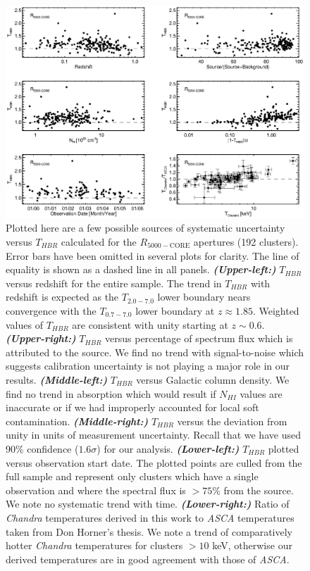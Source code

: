 \clearpage
\begin{figure}
\begin{center}
\includegraphics*[width=\textwidth, trim=0mm 0mm 0mm 0mm, clip]{f5.eps}
\caption{
Plotted here are a few possible sources of systematic uncertainty
versus $T_{HBR}$ calculated for the $R_{5000-\mathrm{CORE}}$
apertures (192 clusters). Error bars have been omitted in several plots for
clarity. The line of equality is shown as a dashed line in all
panels.
{\bfseries\em{(Upper-left:)}} $T_{HBR}$ versus redshift for the
entire sample. The trend in $T_{HBR}$ with redshift is expected as the
$T_{2.0-7.0}$ lower boundary nears convergence with the $T_{0.7-7.0}$
lower boundary at $z \approx 1.85$. Weighted values of $T_{HBR}$ are
consistent with unity starting at $z \sim
0.6$.
{\bfseries\em{(Upper-right:)}} $T_{HBR}$ versus percentage of
spectrum flux which is attributed to the source. We find no trend with
signal-to-noise which suggests calibration uncertainty is not playing
a major role in our results.
{\bfseries\em{(Middle-left:)}} $T_{HBR}$
versus Galactic column density. We find no trend in absorption which
would result if $N_{HI}$ values are inaccurate or if we had improperly
accounted for local soft
contamination.
{\bfseries\em{(Middle-right:)}} $T_{HBR}$ versus the
deviation from unity in units of measurement uncertainty. Recall that
we have used 90\% confidence ($1.6\sigma$) for our analysis.
{\bfseries\em{(Lower-left:)}} $T_{HBR}$ plotted versus
observation start date. The plotted points are culled from the full
sample and represent only clusters which have a single observation and
where the spectral flux is $> 75\%$ from the source. We note no
systematic trend with time.
{\bfseries\em{(Lower-right:)}} Ratio of {\it Chandra}
temperatures derived in this work to {\it ASCA} temperatures taken
from Don Horner's thesis. We note a trend of comparatively hotter {\it
Chandra} temperatures for clusters $> 10$ keV, otherwise our derived
temperatures are in good agreement with those of {\it ASCA}.
}
\label{fig:sysr50}
\end{center}
\end{figure}
\clearpage

